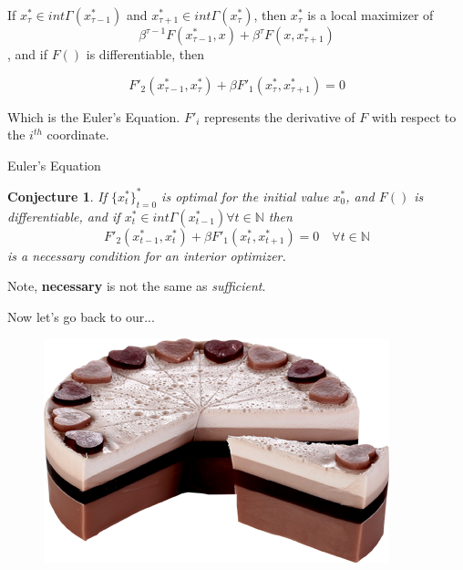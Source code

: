 \documentclass[aspectratio=169]{beamer}
\newtheorem{proposition}{Conjecture}[section]
\begin{document}
\begin{frame}
    
    If $x_\tau^*\in int\Gamma(x_{\tau-1}^*)$ and $x_{\tau+1}^*\in int\Gamma(x_{\tau}^*)$, then $x_\tau^*$ is a local maximizer of $$\beta^{\tau-1} F(x_{\tau-1}^*,x) + \beta^\tau F(x,x_{\tau+1}^*)$$, and if $F()$ is differentiable, then
    
    $$F'_2(x_{\tau-1}^*,x_\tau^*) + \beta F'_1(x_\tau^*,x_{\tau+1}^*) = 0$$
    
    Which is the Euler's Equation. $F'_i$ represents the derivative of $F$ with respect to the $i^{th}$ coordinate.
    
\end{frame}

\begin{frame}{Euler's Equation}

\begin{proposition}
    If $\{x_t^*\}_{t=0}^*$ is optimal for the initial value $x_0^*$, and $F()$ is differentiable, and if $x_t^*\in int \Gamma(x_{t-1}^*) \forall t\in\mathds{N}$ then  $$F'_2(x_{t-1}^*,x_t^*) + \beta F'_1(x_t^*,x_{t+1}^*) = 0\quad\forall t\in\mathds{N}$$ is a necessary condition for an interior optimizer.
\end{proposition}
    
    Note, \textbf{necessary} is not the same as \emph{sufficient}.
    
    Now let's go back to our...
    
\end{frame}


\begin{frame}
    
    \begin{figure}
        \centering
        \includegraphics[scale = 0.8]{cake.png}
    \end{figure}
    
\end{frame}
\end{document}
